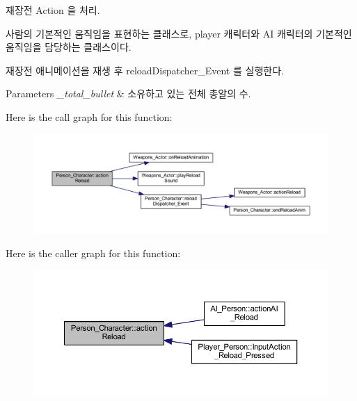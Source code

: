 재장전 Action 을 처리. 

사람의 기본적인 움직임을 표현하는 클래스로, player 캐릭터와 AI 캐릭터의 기본적인 움직임을 담당하는 클래스이다.

재장전 애니메이션을 재생 후 reload\+Dispatcher\+\_\+\+Event 를 실행한다. 
\begin{DoxyParams}{Parameters}
{\em \+\_\+total\+\_\+bullet} & 소유하고 있는 전체 총알의 수. \\
\hline
\end{DoxyParams}


Here is the call graph for this function\+:\nopagebreak
\begin{figure}[H]
\begin{center}
\leavevmode
\includegraphics[width=350pt]{class_person___character_a593f0cb97f1f20e42c4ac6642f7dcefe_cgraph}
\end{center}
\end{figure}




Here is the caller graph for this function\+:\nopagebreak
\begin{figure}[H]
\begin{center}
\leavevmode
\includegraphics[width=350pt]{class_person___character_a593f0cb97f1f20e42c4ac6642f7dcefe_icgraph}
\end{center}
\end{figure}


